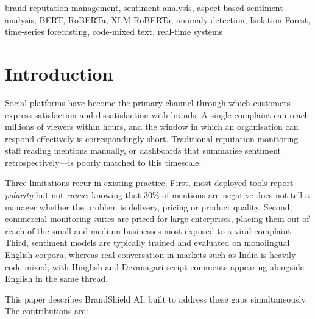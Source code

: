 \documentclass[conference]{IEEEtran}
\begin{document}
\begin{IEEEkeywords}
brand reputation management, sentiment analysis, aspect-based sentiment analysis,
BERT, RoBERTa, XLM-RoBERTa, anomaly detection, Isolation Forest, time-series forecasting, code-mixed
text, real-time systems
\end{IEEEkeywords}

\section{Introduction}

Social platforms have become the primary channel through which customers express
satisfaction and dissatisfaction with brands. A single complaint can reach millions of
viewers within hours, and the window in which an organisation can respond effectively is
correspondingly short. Traditional reputation monitoring---staff reading mentions
manually, or dashboards that summarise sentiment retrospectively---is poorly matched to
this timescale.

Three limitations recur in existing practice. First, most deployed tools report
\emph{polarity} but not \emph{cause}: knowing that 30\% of mentions are negative does not
tell a manager whether the problem is delivery, pricing or product quality. Second,
commercial monitoring suites are priced for large enterprises, placing them out of reach
of the small and medium businesses most exposed to a viral complaint. Third, sentiment
models are typically trained and evaluated on monolingual English corpora, whereas real
conversation in markets such as India is heavily code-mixed, with Hinglish and
Devanagari-script comments appearing alongside English in the same thread.

This paper describes BrandShield AI, built to address these gaps simultaneously. The
contributions are:
\end{document}
